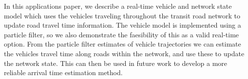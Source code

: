 In this applications paper, we describe a real-time vehicle and network state
model which uses the vehicles traveling throughout the transit road network
to update road travel time information.
The vehicle model is implemented using a particle filter,
so we also demonstrate the faesibility of this as a valid real-time option.
From the particle filter estimates of vehicle trajectories we 
can estimate the vehicles travel time along roads within the network,
and use these to update the network state.
This can then be used in future work to develop a more reliable 
arrival time estimation method.
















